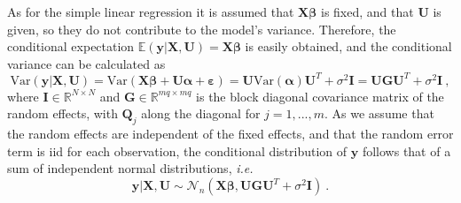 As for the simple linear regression it is assumed that $\mathbf{X}\boldsymbol{\beta}$ is fixed, and that $\mathbf{U}$ is given, so they do not contribute to the model's variance. Therefore, the conditional expectation $\mathbb{E}(\mathbf{y} \lvert \mathbf{X}, \mathbf{U}) = \mathbf{X}\boldsymbol{\beta}$ is easily obtained, and the conditional variance can be calculated as
\begin{equation} \label{eq:cond_var_LMM}
    \text{Var}(\mathbf{y} \lvert \mathbf{X}, \mathbf{U}) = \text{Var}(\mathbf{X}\boldsymbol{\beta}  + \mathbf{U}\boldsymbol{\alpha} + \boldsymbol{\varepsilon}) = \mathbf{U}\text{Var}(\boldsymbol{\alpha})\mathbf{U}^T + \sigma^2\mathbf{I} = \mathbf{U}\mathbf{G}\mathbf{U}^T + \sigma^2\mathbf{I} \ ,
\end{equation}
where $\mathbf{I}\in \mathbb{R}^{N\times N}$ and $\mathbf{G} \in \mathbb{R}^{mq \times mq}$ is the block diagonal covariance matrix of the random effects, with $\mathbf{Q}_j$ along the diagonal for $j=1, ..., m$. 
As we assume that the random effects are independent of the fixed effects, and that the random error term is iid for each observation, the conditional distribution of $\mathbf{y}$ follows that of a sum of independent normal distributions, \textit{i.e.}
\begin{equation}
    \mathbf{y} \lvert \mathbf{X}, \mathbf{U} \sim \mathcal{N}_n(\mathbf{X}\boldsymbol{\beta}, \mathbf{U}\mathbf{G}\mathbf{U}^T + \sigma^2\mathbf{I}) \ .
\end{equation}





